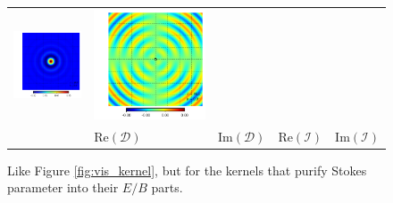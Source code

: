\documentclass[a4paper,11pt]{article}
\begin{document}
\begin{figure}[!t]
\begin{center}
\begin{tabular}{m{8ex}m{}m{}|m{}m{}}
\hspace{\kernelfigspace}\includegraphics[width=\kernelfigwidth]{qu2ebqu_rker_I_lat0_lon90.pdf} &
\hspace{\kernelfigspace}\includegraphics[width=\kernelfigwidth]{qu2ebqu_iker_I_lat0_lon90.pdf} \\
&
\centering $\textrm{Re} \left(\mathcal{D} \right)$ &
\centering $\textrm{Im} \left(\mathcal{D} \right)$ &
\centering $\textrm{Re} \left(\mathcal{I} \right)$ &
\centering $\textrm{Im} \left(\mathcal{I} \right)$
  \end{tabular}
  \end{center}
  \caption{Like Figure \ref{fig:vis_kernel}, but for the kernels that purify Stokes parameter into their $E/B$ parts.} \label{fig:vis_kernel_DI}
\end{figure}
\end{document}
